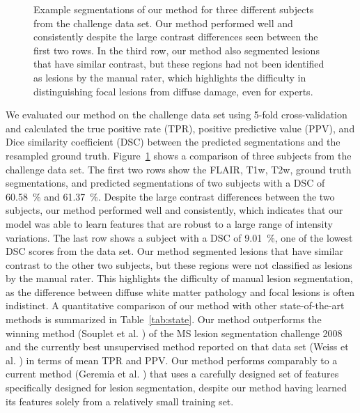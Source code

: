 \begin{figure}[tb]

\caption{Example segmentations of our method for three different subjects from
the challenge data set. Our method performed well and consistently despite the
large contrast differences seen between the first two rows. In the third row,
our method also segmented lesions that have similar contrast, but these regions
had not been identified as lesions by the manual rater, which highlights the
difficulty in distinguishing focal lesions from diffuse damage, even for
experts.}

\label{fig:segmentation}
\end{figure}

We evaluated our method on the challenge data set using 5-fold
cross-valida\-tion and calculated the true positive rate (TPR), positive
predictive value (PPV), and Dice similarity coefficient (DSC) between the
predicted segmentations and the resampled ground truth.
Figure~\ref{fig:segmentation} shows a comparison of three subjects from the
challenge data set. The first two rows show the FLAIR, T1w, T2w, ground truth
segmentations, and predicted segmentations of two subjects with a DSC of
\SI{60.58}{\percent} and \SI{61.37}{\percent}. Despite the large contrast
differences between the two subjects, our method performed well and
consistently, which indicates that our model was able to learn features that are
robust to a large range of intensity variations. The last row shows a subject
with a DSC of \SI{9.01}{\percent}, one of the lowest DSC scores from the data
set. Our method segmented lesions that have similar contrast to the other two
subjects, but these regions were not classified as lesions by the manual rater.
This highlights the difficulty of manual lesion segmentation, as the difference
between diffuse white matter pathology and focal lesions is often indistinct. A
quantitative comparison of our method with other state-of-the-art methods is
summarized in Table~\ref{tab:state}. Our method outperforms the winning method
(Souplet et al. \cite{souplet2008}) of the MS lesion segmentation challenge 2008
and the currently best unsupervised method reported on that data set (Weiss et
al. \cite{weiss2013}) in terms of mean TPR and PPV. Our method performs
comparably to a current method (Geremia et al. \cite{geremia2010}) that uses a
carefully designed set of features specifically designed for lesion
segmentation, despite our method having learned its features solely from a
relatively small training set.

